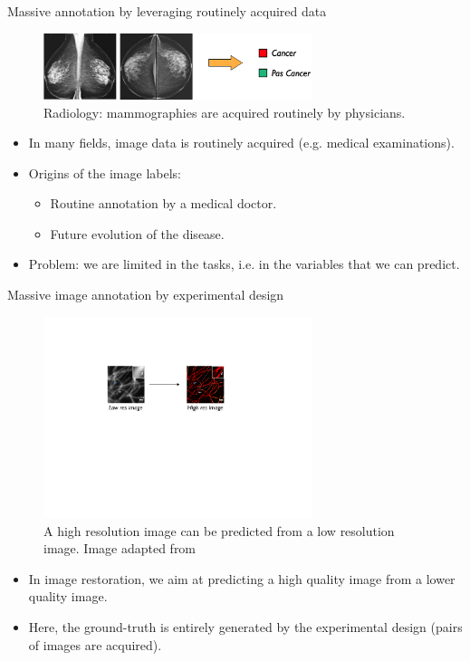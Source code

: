 \documentclass[xcolor=pdftex,dvipsnames,table]{beamer}
\begin{document}
\begin{frame}{Massive annotation by leveraging routinely acquired data}
\begin{figure}[htb]
   \centering
   \includegraphics[width=0.7\textwidth]{../graphics/radiology.pdf}
   \caption{Radiology: mammographies are acquired routinely by physicians.}
\end{figure}
\begin{itemize}
   \item In many fields, image data is routinely acquired (e.g. medical examinations). 
   \item Origins of the image labels:
   \begin{itemize}
      \item Routine annotation by a medical doctor.
      \item Future evolution of the disease.
   \end{itemize}
   \item Problem: we are limited in the tasks, i.e. in the variables that we can predict. 
\end{itemize}
\end{frame}

\begin{frame}{Massive image annotation by experimental design}
\begin{figure}[htb]
   \centering
   \includegraphics[width=0.7\textwidth]{../graphics/super_resolution.pdf}
   \caption{A high resolution image can be predicted from a low resolution image. Image adapted from \cite{Ouyang2018}}
\end{figure}
\begin{itemize}
   \item In image restoration, we aim at predicting a high quality image from a lower quality image. 
   \item Here, the ground-truth is entirely generated by the experimental design (pairs of images are acquired). 
\end{itemize}
\end{frame}
\end{document}
